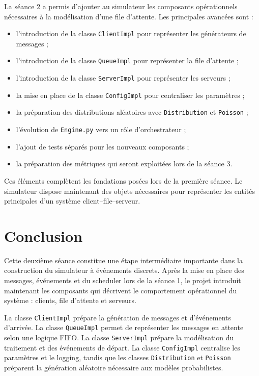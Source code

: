 \documentclass{article}
\begin{document}
La séance 2 a permis d’ajouter au simulateur les composants opérationnels nécessaires à la modélisation d’une file d’attente. Les principales avancées sont :
\begin{itemize}[leftmargin=*]
    \item l’introduction de la classe \texttt{ClientImpl} pour représenter les générateurs de messages ;
    \item l’introduction de la classe \texttt{QueueImpl} pour représenter la file d’attente ;
    \item l’introduction de la classe \texttt{ServerImpl} pour représenter les serveurs ;
    \item la mise en place de la classe \texttt{ConfigImpl} pour centraliser les paramètres ;
    \item la préparation des distributions aléatoires avec \texttt{Distribution} et \texttt{Poisson} ;
    \item l’évolution de \texttt{Engine.py} vers un rôle d’orchestrateur ;
    \item l’ajout de tests séparés pour les nouveaux composants ;
    \item la préparation des métriques qui seront exploitées lors de la séance 3.
\end{itemize}

Ces éléments complètent les fondations posées lors de la première séance. Le simulateur dispose maintenant des objets nécessaires pour représenter les entités principales d’un système client--file--serveur.

\section{Conclusion}

Cette deuxième séance constitue une étape intermédiaire importante dans la construction du simulateur à événements discrets. Après la mise en place des messages, événements et du scheduler lors de la séance 1, le projet introduit maintenant les composants qui décrivent le comportement opérationnel du système : clients, file d’attente et serveurs.

La classe \texttt{ClientImpl} prépare la génération de messages et d’événements d’arrivée. La classe \texttt{QueueImpl} permet de représenter les messages en attente selon une logique FIFO. La classe \texttt{ServerImpl} prépare la modélisation du traitement et des événements de départ. La classe \texttt{ConfigImpl} centralise les paramètres et le logging, tandis que les classes \texttt{Distribution} et \texttt{Poisson} préparent la génération aléatoire nécessaire aux modèles probabilistes.
\end{document}
